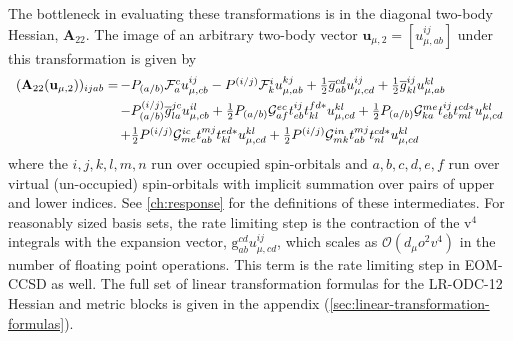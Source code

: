 The bottleneck in evaluating these transformations is in the diagonal two-body
Hessian, \(\mathbf{A}_{22}\).
The image of an arbitrary two-body vector
\(
    \mathbf{u}_{\mu,2}
    =
    [u_{\mu,ab}^{ij}]
\)
under this transformation is given by
\begin{equation}
    \label{eq:two-body-hessian-function-in-text}
    \begin{array}{r@{\,}l}
        (\mathbf{A}_{22}(\mathbf{u}_{\mu,2}))_{ijab}
        =
        &
        -
        P_{(a/b)}
        \mathcal{F}_a^c
        u_{\mu,cb}^{ij}
        -
        P^{(i/j)}
        \mathcal{F}_k^i
        u_{\mu,ab}^{kj}
        +
        \tfrac{1}{2}
        \overline{g}_{ab}^{cd}
        u_{\mu,cd}^{ij}
        +
        \tfrac{1}{2}
        \overline{g}_{kl}^{ij}
        u_{\mu,ab}^{kl}
        \\[5pt]
        &
        -
        P_{(a/b)}^{(i/j)}
        \overline{g}_{la}^{jc}
        u_{\mu,cb}^{il}
        +
        \tfrac{1}{2}
        P_{(a/b)}
        \mathcal{G}_{af}^{ec}
        t_{eb}^{ij}
        t_{kl}^{fd*}
        u_{\mu,cd}^{kl}
        +
        \tfrac{1}{2}
        P_{(a/b)}
        \mathcal{G}_{ka}^{me}
        t_{eb}^{ij}
        t_{ml}^{cd*}
        u_{\mu,cd}^{kl}
        \\[5pt]
        &
        +
        \tfrac{1}{2}
        P^{(i/j)}
        \mathcal{G}_{me}^{ic}
        t_{ab}^{mj}
        t_{kl}^{ed*}
        u_{\mu,cd}^{kl}
        +
        \tfrac{1}{2}
        P^{(i/j)}
        \mathcal{G}_{mk}^{in}
        t_{ab}^{mj}
        t_{nl}^{cd*}
        u_{\mu,cd}^{kl}
    \end{array}
\end{equation}
where the \(i,j,k,l,m,n\) run over occupied spin-orbitals and \(a,b,c,d,e,f\)
run over virtual (un-occupied) spin-orbitals with implicit summation over
pairs of upper and lower indices.
See \cref{ch:response} for the definitions of these intermediates.
For reasonably sized basis sets, the rate limiting step is the contraction of
the \(\mathrm{v}^4\) integrals with the expansion vector,
\(\mathrm{g}_{ab}^{cd}u_{\mu,cd}^{ij}\), which scales as
\(\mathcal{O}(d_\mu o^2v^4)\) in the number of floating point
operations.
This term is the rate limiting step in EOM-CCSD as well.
The full set of linear transformation formulas for the LR-ODC-12 Hessian and
metric blocks is given in the appendix
(\cref{sec:linear-transformation-formulas}).

